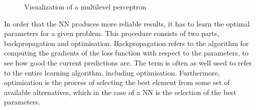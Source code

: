 \begin{figure}[htbp]
    \centering
    \caption{Visualization of a multilevel perceptron}
    \label{fig:MLP-Visualisation}
\end{figure}
\noindent
In order that the \gls{NN} produces more reliable results, it has to learn the optimal parameters for a given problem. This procedure consists of two parts, backpropagation and optimisation. Backpropagation refers to the algorithm for computing the gradients of the loss function with respect to the parameters, to see how good the current predictions are. The term is often as well used to refer to the entire learning algorithm, including optimisation. Furthermore, optimisation is the process of selecting the best element from some set of available alternatives, which in the case of a \gls{NN} is the selection of the best parameters.
